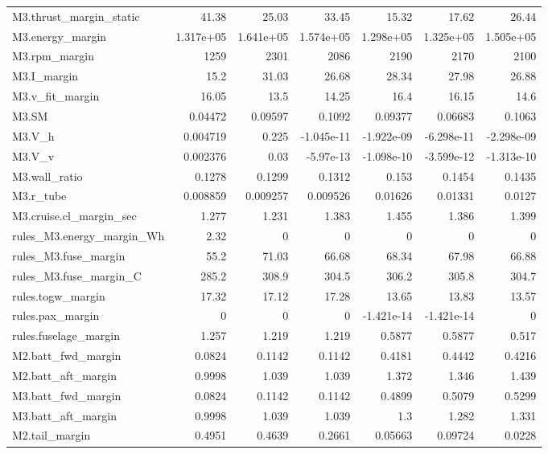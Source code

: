 \begin{table}[htbp]
{\begin{tabular}{lrrrrrr}
M3.thrust\_margin\_static & 41.38 & 25.03 & 33.45 & 15.32 & 17.62 & 26.44 \\
M3.energy\_margin & 1.317e+05 & 1.641e+05 & 1.574e+05 & 1.298e+05 & 1.325e+05 & 1.505e+05 \\
M3.rpm\_margin & 1259 & 2301 & 2086 & 2190 & 2170 & 2100 \\
M3.I\_margin & 15.2 & 31.03 & 26.68 & 28.34 & 27.98 & 26.88 \\
M3.v\_fit\_margin & 16.05 & 13.5 & 14.25 & 16.4 & 16.15 & 14.6 \\
M3.SM & 0.04472 & 0.09597 & 0.1092 & 0.09377 & 0.06683 & 0.1063 \\
M3.V\_h & 0.004719 & 0.225 & -1.045e-11 & -1.922e-09 & -6.298e-11 & -2.298e-09 \\
M3.V\_v & 0.002376 & 0.03 & -5.97e-13 & -1.098e-10 & -3.599e-12 & -1.313e-10 \\
M3.wall\_ratio & 0.1278 & 0.1299 & 0.1312 & 0.153 & 0.1454 & 0.1435 \\
M3.r\_tube & 0.008859 & 0.009257 & 0.009526 & 0.01626 & 0.01331 & 0.0127 \\
M3.cruise.cl\_margin\_sec & 1.277 & 1.231 & 1.383 & 1.455 & 1.386 & 1.399 \\
rules\_M3.energy\_margin\_Wh & 2.32 & 0 & 0 & 0 & 0 & 0 \\
rules\_M3.fuse\_margin & 55.2 & 71.03 & 66.68 & 68.34 & 67.98 & 66.88 \\
rules\_M3.fuse\_margin\_C & 285.2 & 308.9 & 304.5 & 306.2 & 305.8 & 304.7 \\
rules.togw\_margin & 17.32 & 17.12 & 17.28 & 13.65 & 13.83 & 13.57 \\
rules.pax\_margin & 0 & 0 & 0 & -1.421e-14 & -1.421e-14 & 0 \\
rules.fuselage\_margin & 1.257 & 1.219 & 1.219 & 0.5877 & 0.5877 & 0.517 \\
M2.batt\_fwd\_margin & 0.0824 & 0.1142 & 0.1142 & 0.4181 & 0.4442 & 0.4216 \\
M2.batt\_aft\_margin & 0.9998 & 1.039 & 1.039 & 1.372 & 1.346 & 1.439 \\
M3.batt\_fwd\_margin & 0.0824 & 0.1142 & 0.1142 & 0.4899 & 0.5079 & 0.5299 \\
M3.batt\_aft\_margin & 0.9998 & 1.039 & 1.039 & 1.3 & 1.282 & 1.331 \\
M2.tail\_margin & 0.4951 & 0.4639 & 0.2661 & 0.05663 & 0.09724 & 0.0228 \\
\bottomrule
\end{tabular}}
\end{table}
